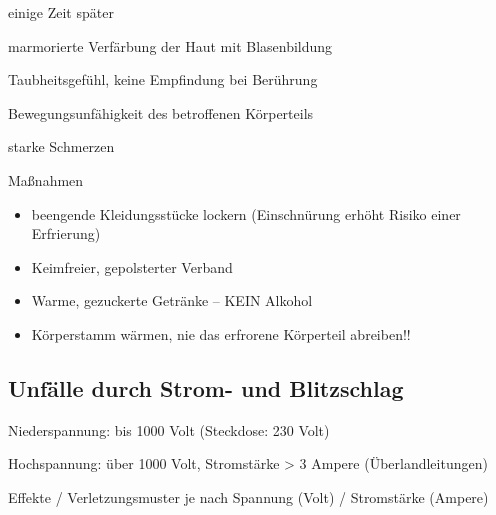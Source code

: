 \documentclass{article}
\begin{document}
 einige Zeit sp\"ater

marmorierte Verf\"arbung der Haut mit  Blasenbildung

Taubheitsgef\"uhl, keine Empfindung bei  Ber\"uhrung

Bewegungsunf\"ahigkeit des betroffenen  K\"orperteils

starke Schmerzen

Ma{\ss}nahmen

\begin{itemize}
\item beengende Kleidungsst\"ucke lockern (Einschn\"urung erh\"oht
Risiko einer Erfrierung)

\item Keimfreier, gepolsterter Verband

\item Warme, gezuckerte Getr\"anke -- KEIN Alkohol

\item K\"orperstamm w\"armen, nie das erfrorene K\"orperteil abreiben!!

\end{itemize}
\subsection{Unf\"alle durch Strom- und Blitzschlag}
Niederspannung: bis 1000 Volt (Steckdose:  230 Volt)

Hochspannung: \"uber 1000 Volt, Stromst\"arke {\textgreater}  3 Ampere
(\"Uberlandleitungen) 

Effekte / Verletzungsmuster je nach  Spannung (Volt) / Stromst\"arke
(Ampere)
\end{document}

